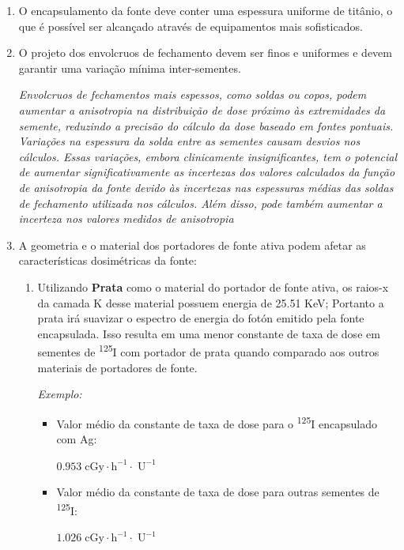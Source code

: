 \documentclass[11pt,a4paper]{article}
\begin{document}
				\begin{enumerate}
					\item O encapsulamento da fonte deve conter uma espessura uniforme de titânio, o que é possível ser alcançado através de equipamentos mais sofisticados.
					
					\item O projeto dos envolcruos de fechamento devem ser finos e uniformes e devem garantir uma variação mínima inter-sementes. 

						\textit{Envolcruos de fechamentos mais espessos, como soldas ou copos, podem aumentar a anisotropia na distribuição de dose próximo às extremidades da semente, reduzindo a precisão do cálculo da dose baseado em fontes pontuais. Variações na espessura da solda entre as sementes causam desvios nos cálculos. Essas variações, embora clinicamente insignificantes, tem o potencial de aumentar significativamente as incertezas dos valores calculados da função de anisotropia da fonte devido às incertezas nas espessuras médias das soldas de fechamento utilizada nos cálculos. Além disso, pode também aumentar a incerteza nos valores medidos de anisotropia}
					
					\item A geometria e o material dos portadores de fonte ativa podem afetar as características dosimétricas da fonte:
					
						\begin{enumerate}
							\item Utilizando \textbf{Prata} como o material do portador de fonte ativa, os raios-x da camada K desse material possuem energia de 25.51 KeV; Portanto a prata irá suavizar o espectro de energia do fotón emitido pela fonte encapsulada. Isso resulta em uma menor constante de taxa de dose em sementes de \textsuperscript{125}I com portador de prata quando comparado aos outros materiais de portadores de fonte.
							
								\textit{\textcolor{CarnationPink}{Exemplo:}} 
									\begin{itemize}
										\item Valor médio da constante de taxa de dose para o \textsuperscript{125}I encapsulado com Ag:
										
											\textbf{$\mathrm{0.953 \; cGy \cdot h^{-1} \cdot \; U^{-1}}$}
										\item Valor médio da constante de taxa de dose para outras sementes de \textsuperscript{125}I:
										
											\textbf{$\mathrm{1.026 \; cGy \cdot h^{-1} \cdot \; U^{-1}}$}
									\end{itemize}


\end{enumerate}
\end{enumerate}
\end{document}
